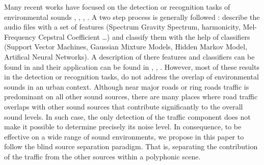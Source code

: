 \documentclass[twocolumn,a4paper,10pt]{article}
\begin{document}
Many recent works have focused on the detection  or recognition tasks of environmental sounds \cite{heittola_sound_2011},  \cite{defreville_automatic_2006},  \cite{dufaux_automatic_2000}, \cite{chu_environmental_2009}. A two step process is generally followed : describe the audio files with a set of features (Spectrum Gravity Spectrum, harmonicity, Mel-Frequency Cepstral Coefficient \dots) and classify them with the help of classifiers (Support Vector Machines, Gaussian Mixture Models, Hidden Markov Model, Artifical Neural Networks). A description of there features and classifiers can be found in \cite{cowling_comparison_2003} and their application can be found in \cite{shen_environmental_2012}, \cite{beritelli_pattern_2008}, \cite{couvreur_automatic_2004}.
However, most of these results in the detection or recognition tasks, do not address the overlap of environmental sounds in an urban context. Although near major roads or ring roads traffic is predominant on all other sound sources, there are many places where road traffic overlaps with other sound sources that contribute significantly to the overall sound levels. In such case, the only detection of the traffic component does not make it possible to determine precisely its noise level. In consequence, to be effective on a wide range of sound environments, we propose in this paper to follow the blind source separation paradigm. That is, separating the contribution of the traffic from the other sources within a polyphonic scene.
\end{document}

